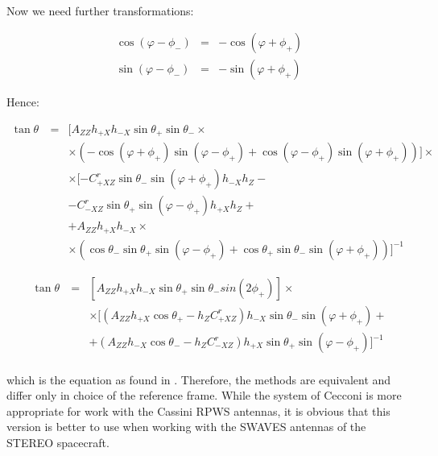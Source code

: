 \documentclass[a4paper,10pt]{thesis}
\begin{document}
\paragraph*{}
Now we need further transformations:

\begin{eqnarray}
 \cos (\varphi - \phi_-) &=& -\cos (\varphi + \phi_+) \\
\sin (\varphi - \phi_-) &=& -\sin (\varphi + \phi_+)
\end{eqnarray}

Hence:

\begin{eqnarray}\label{tan_theta_cecconi}
\tan \theta\  &=&
[A_{ZZ} h_{+X}h_{-X} \sin \theta_+  \sin \theta_- \times \\
&&\times ( -\cos (\varphi + \phi_+)  \sin (\varphi - \phi_+) +\cos (\varphi - \phi_+)  \sin (\varphi + \phi_+))]\times \nonumber \\
&&\times [-C_{+XZ}^r \sin \theta_-  \sin (\varphi + \phi_+) h_{-X} h_{Z} -\nonumber \\
&&-C_{-XZ}^r \sin \theta_+  \sin (\varphi - \phi_+) h_{+X} h_{Z}+ \nonumber \\
&&+ A_{ZZ} h_{+X} h_{-X} \times \nonumber \\
&&\times(\cos \theta_- \sin \theta_+  \sin (\varphi - \phi_+ )+\cos \theta_+  \sin \theta_-  \sin (\varphi + \phi_+))]^{-1} \nonumber
\end{eqnarray}

\begin{eqnarray}\label{tan_theta_cecconi2}
\tan \theta\  &=&
[A_{ZZ} h_{+X}h_{-X} \sin \theta_+  \sin \theta_-  sin(2 \phi_+)] \times \\
&& \times [(A_{ZZ} h_{+X} \cos \theta_+- h_{Z} C_{+XZ}^r) h_{-X} \sin \theta_-  \sin (\varphi + \phi_+)+   \nonumber \\
&&+(A_{ZZ} h_{-X} \cos \theta_- - h_{Z} C_{-XZ}^r) h_{+X} \sin \theta_+  \sin (\varphi - \phi_+) ]^{-1} \nonumber
\end{eqnarray}

\paragraph*{}
which is the equation as found in \cite{cecconi04}. Therefore, the methods are equivalent and differ only in choice of the reference frame. While the system of Cecconi is more appropriate for work with the Cassini RPWS antennas, it is obvious that this version is better to use when working with the SWAVES antennas of the STEREO spacecraft.
\end{document}
